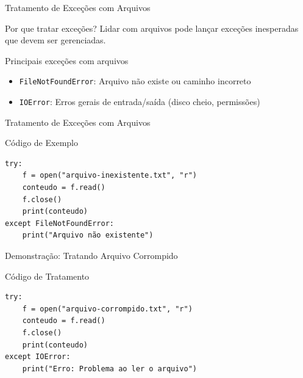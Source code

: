 \begin{frame}[fragile]{Tratamento de Exceções com Arquivos}

    \begin{block}{Por que tratar exceções?}
        Lidar com arquivos pode lançar exceções inesperadas que devem ser gerenciadas.
    \end{block}

    \begin{block}{Principais exceções com arquivos}
        \begin{itemize}
            \item \texttt{FileNotFoundError}: Arquivo não existe ou caminho incorreto
            \item \texttt{IOError}: Erros gerais de entrada/saída (disco cheio, permissões)
        \end{itemize}
    \end{block}




\end{frame}

\begin{frame}[fragile]{Tratamento de Exceções com Arquivos}

    \begin{block}{Código de Exemplo}
        \begin{verbatim}
try:
    f = open("arquivo-inexistente.txt", "r")
    conteudo = f.read()
    f.close()
    print(conteudo)
except FileNotFoundError:
    print("Arquivo não existente")
\end{verbatim}
    \end{block}




\end{frame}

\begin{frame}[fragile]{Demonstração: Tratando Arquivo Corrompido}

    \begin{block}{Código de Tratamento}
        \begin{verbatim}
try:
    f = open("arquivo-corrompido.txt", "r")
    conteudo = f.read()
    f.close()
    print(conteudo)
except IOError:
    print("Erro: Problema ao ler o arquivo")
\end{verbatim}
    \end{block}


\end{frame}

